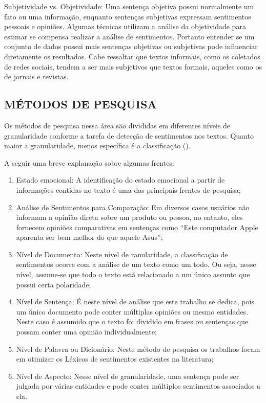 \documentclass[12pt, a4paper]{article}
\begin{document}
Subjetividade vs. Objetividade: Uma sentença objetiva possui normalmente um fato ou uma informação, enquanto sentenças subjetivas expressam sentimentos pessoais e opiniões. Algumas técnicas utilizam a análise da objetividade para estimar se compensa realizar a análise de sentimentos. Portanto entender se um conjunto de dados possui mais sentenças objetivas ou subjetivas pode influenciar diretamente os resultados. Cabe ressaltar que textos informais, como os coletados de redes sociais, tendem a ser mais subjetivos que textos formais, aqueles como os de jornais e revistas.

\newpage
\subsection{MÉTODOS DE PESQUISA}
Os métodos de pesquisa nessa área são divididas em diferentes níveis de granularidade conforme a tarefa de detecção de sentimentos nos textos. Quanto maior a granularidade, menos específica é a classificação (\citeauthor{Bevenuto}).

\bigskip 
A seguir uma breve explanação sobre algumas frentes:

\medskip
\begin{enumerate}
\item Estado emocional: A identificação do estado emocional a partir de informações contidas no texto é uma das principais frentes de pesquisa;
\item Análise de Sentimentos para Comparação: Em diversos casos usuários não informam a opinião direta sobre um produto ou pessoa, no entanto, eles fornecem opiniões comparativas em sentenças como “Este computador Apple aparenta ser bem melhor do que aquele Asus”;
\item Nível de Documento: Neste nível de ranularidade, a classificação de sentimentos ocorre com a análise de um texto como um todo. Ou seja, nesse nível, assume-se que todo o texto está relacionado a um único assunto que possui certa polaridade;
\item Nível de Sentença: É neste nível de análise que este trabalho se dedica, pois um único documento pode conter múltiplas opiniões ou mesmo entidades. Neste caso é assumido que o texto foi dividido em frases ou sentenças que possam conter uma opinião individualmente;
\item Nível de Palavra ou Dicionário: Neste método de pesquisa os trabalhos focam em otimizar os Léxicos de sentimentos existentes na literatura;
\item Nível de Aspecto: Nesse nível de granularidade, uma sentença pode ser julgada por várias entidades e pode conter múltiplos sentimentos associados a ela.
\end{enumerate}
\end{document}
